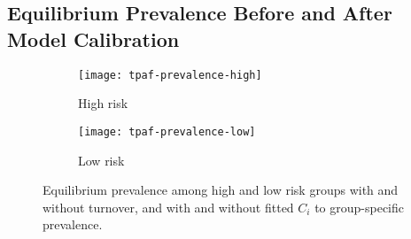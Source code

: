 \subsection{Equilibrium Prevalence Before and After Model Calibration}
\begin{figure}[H]
  \centering
  \begin{subfigure}{0.45\linewidth}
    \centering
    \texttt{[image: tpaf-prevalence-high]}
    \caption{High risk}
    \label{fig:tpaf-prevalence-high}
  \end{subfigure}
  \begin{subfigure}{0.45\linewidth}
    \centering
    \texttt{[image: tpaf-prevalence-low]}
    \caption{Low risk}
    \label{fig:tpaf-prevalence-low}
  \end{subfigure}
  \caption{Equilibrium prevalence among high and low risk groups
    with and without turnover,
    and with and without fitted $C_i$ to group-specific prevalence.}
  \label{fig:tpaf-prevalence}
\end{figure}
